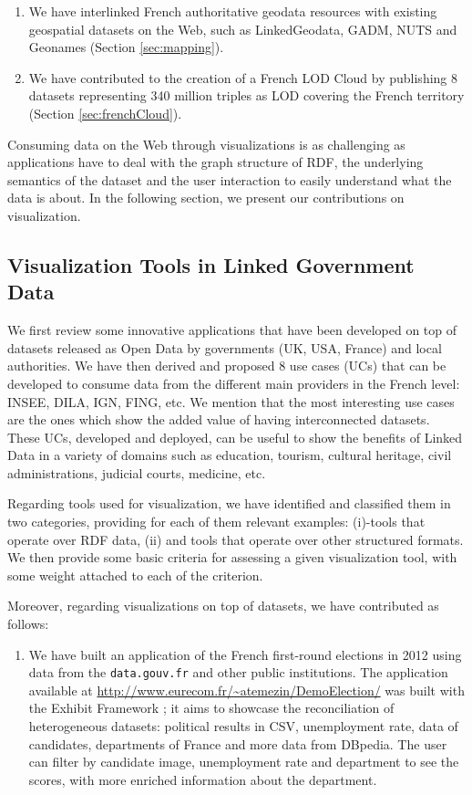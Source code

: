 \begin{enumerate}
\begin{enumerate}
 \item We have interlinked French authoritative geodata resources with existing geospatial datasets on the Web, such as LinkedGeodata, GADM, NUTS and Geonames (Section \ref{sec:mapping}).
 
 \item We have contributed to the creation of a French LOD Cloud by publishing 8 datasets representing 340 million triples as LOD covering the French territory (Section \ref{sec:frenchCloud}).
 

\end{enumerate}


Consuming data on the Web through visualizations is as challenging as applications have to deal with the graph structure of RDF, the underlying semantics of the dataset and the user interaction to easily understand what the data is about. In the following section, we present our contributions on visualization.
\subsection{Visualization Tools in Linked Government Data} \label{visu}

We first review some innovative applications that have been developed on top of datasets released as Open Data by governments (UK, USA, France) and local authorities. We have then derived and proposed 8 use cases (UCs) that can be developed to consume data from the different main providers in the French level: INSEE, DILA, IGN, FING, etc. We mention that the most interesting use cases are the ones which show the added value of having interconnected datasets. These UCs,  developed and deployed, can be useful to show the benefits of Linked Data in a variety of domains such as education, tourism, cultural heritage, civil administrations, judicial courts, medicine, etc. 

Regarding tools used for visualization, we have identified and classified them in two categories, providing for each of them relevant examples: (i)-tools that operate over RDF data, (ii) and tools that operate over other structured formats. We then provide some basic criteria for assessing a given visualization tool, with some weight attached to each of the criterion. 

Moreover, regarding visualizations on top of datasets, we have contributed as follows:
\begin{enumerate}


\item We have built an application of the French first-round elections in 2012 using data from the \texttt{data.gouv.fr} and other public institutions. The application available at \url{http://www.eurecom.fr/~atemezin/DemoElection/} was built with the Exhibit Framework \cite{exhibit2007}; it aims to showcase the reconciliation of heterogeneous datasets: political results in CSV, unemployment rate, data of candidates, departments of France and more data from DBpedia. The user can filter by candidate image, unemployment rate and department to see the scores, with more enriched information about the department.
 

\end{enumerate}
\end{enumerate}
